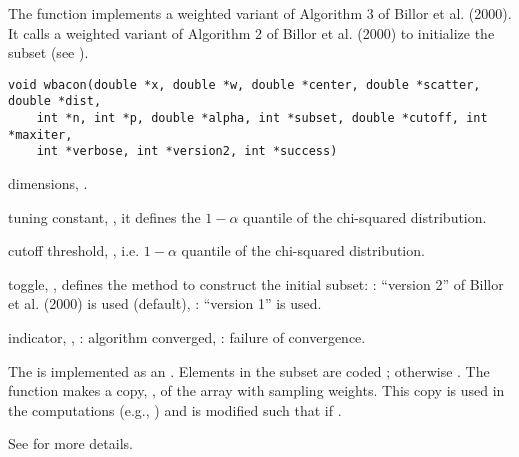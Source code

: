 \documentclass[a4paper,oneside,10pt,DIV=12]{scrreprt}
\begin{document}
\begin{Description}
The function implements a weighted variant of Algorithm 3 of Billor et al.
(2000). It calls a weighted variant of Algorithm 2 of Billor et al. (2000) to
initialize the subset (see ). 
\end{Description}
\begin{Usage}
\begin{verbatim}
void wbacon(double *x, double *w, double *center, double *scatter, double *dist,
    int *n, int *p, double *alpha, int *subset, double *cutoff, int *maxiter,
    int *verbose, int *version2, int *success)
\end{verbatim}
\end{Usage}
\begin{Arguments}
	\begin{ldescription}
		\CENTER
		\SCATTER
		\DIST
		\item[\code{n, p}] dimensions, \code{[int]}.
		\item[\code{alpha}] tuning constant, \code{[double]}, it defines the 
			$1-\alpha$ quantile of the chi-squared distribution.
		\SUBSET{}
		\item[\code{cutoff}] cutoff threshold, \code{[double]}, i.e. $1-\alpha$
			quantile of the chi-squared distribution.
		\VERBOSE
		\item[\code{version2}] toggle, \code{[int]}, defines the method to
			construct the initial subset: : ``version 2'' of Billor et
			al. (2000) is used (default), : ``version 1'' is used.
		\item[\code{success}] indicator, \code{[int]}, : algorithm 
			converged, : failure of convergence.
	\end{ldescription}
\end{Arguments}
\begin{Details}
The  is implemented as an . Elements in the
subset are coded ; otherwise . The function makes a copy,
, of the array  with sampling weights. This copy is used
in the computations (e.g., ) and is modified such that
 if .  

See  for more details.
\end{Details}
\end{document}
